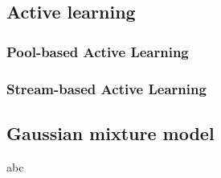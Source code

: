  





\subsection{Active learning}

\subsubsection{Pool-based Active Learning}

\subsubsection{Stream-based Active Learning}

\subsection{Gaussian mixture model}
abc








